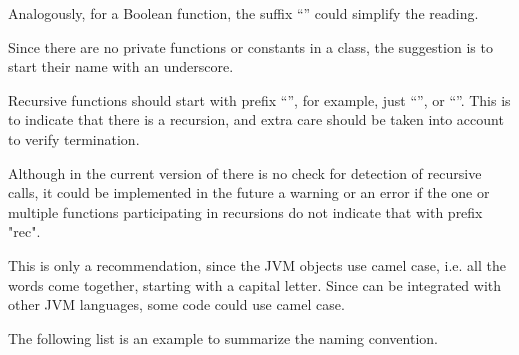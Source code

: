 Analogously, for a Boolean function, the suffix ``'' could simplify the reading.

Since there are no private functions or constants in a class, the suggestion is to start their name with an underscore.

Recursive functions should start with prefix ``'', for example, just ``'', or ``''.
This is to indicate that there is a recursion, and extra care should be taken into account to verify termination.

Although in the current version of \Soda there is no check for detection of recursive calls, it could be implemented in the future a warning or an error if the one or multiple functions participating in recursions do not indicate that with prefix "rec".

This is only a recommendation, since the JVM objects use camel case, i.e. all the words come together, starting with a capital letter.
Since \Soda can be integrated with other JVM languages, some \Soda code could use camel case.

The following list is an example to summarize the naming convention.

